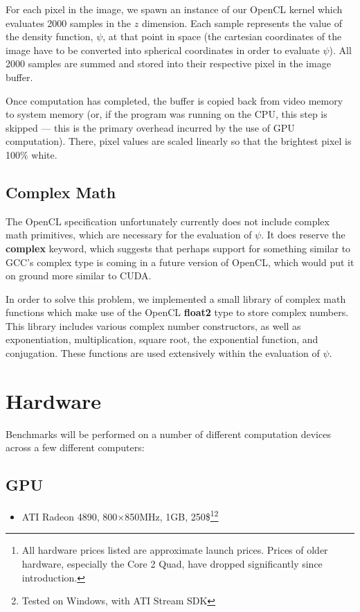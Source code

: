 \documentclass{acmsiggraph}
\begin{document}
For each pixel in the image, we spawn an instance of our OpenCL kernel which evaluates 2000 samples in the $z$ dimension. Each sample represents the value of the density function, $\psi$, at that point in space (the cartesian coordinates of the image have to be converted into spherical coordinates in order to evaluate $\psi$). All 2000 samples are summed and stored into their respective pixel in the image buffer.

Once computation has completed, the buffer is copied back from video memory to system memory (or, if the program was running on the CPU, this step is skipped --- this is the primary overhead incurred by the use of GPU computation). There, pixel values are scaled linearly so that the brightest pixel is 100\% white.

\subsection{Complex Math}

The OpenCL specification unfortunately currently does not include complex math primitives, which are necessary for the evaluation of $\psi$. It does reserve the {\bf complex} keyword, which suggests that perhaps support for something similar to GCC's complex type is coming in a future version of OpenCL, which would put it on ground more similar to CUDA.

In order to solve this problem, we implemented a small library of complex math functions which make use of the OpenCL {\bf float2} type to store complex numbers. This library includes various complex number constructors, as well as exponentiation, multiplication, square root, the exponential function, and conjugation. These functions are used extensively within the evaluation of $\psi$.

\section{Hardware}

Benchmarks will be performed on a number of different computation devices across a few different computers:

\subsection{GPU}

\begin{itemize}

\item ATI Radeon 4890, 800$\times$850MHz, 1GB, 250\$\footnote{All hardware prices listed are approximate launch prices. Prices of older hardware, especially the Core 2 Quad, have dropped significantly since introduction.\label{fn:prices}}\footnote{Tested on Windows, with ATI Stream SDK\label{fn:windows}}

\end{itemize}
\end{document}
